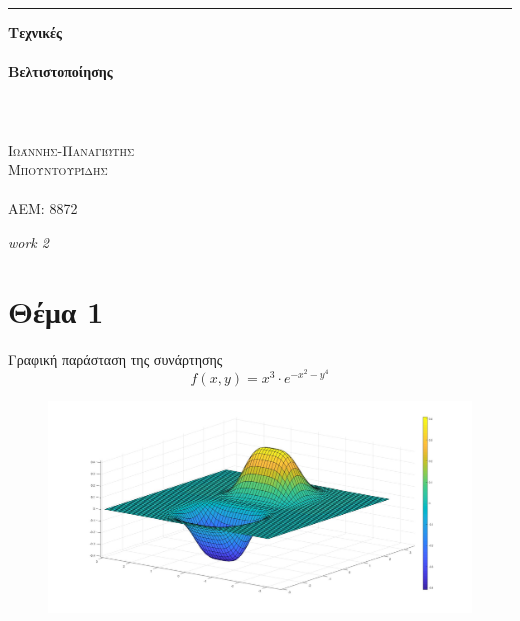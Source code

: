 \documentclass{article}
\date{}
\begin{document}
\begin{titlepage} %
	
	\raggedleft %
	
	\rule{1pt}{\textheight} %
	\hspace{0.05\textwidth} %
	\parbox[b]{0.75\textwidth}{ %
		
		{\Huge\bfseries Τεχνικές \\ \\
		Βελτιστοποίησης\\ \\ }\\[2\baselineskip] %
		{\large\textit{ }}\\[4\baselineskip] %
		{\Large\textsc{Ιωάννης-Παναγιώτης \\Μπουντουρίδης}} %
	\\	\\{\large\textsc{ΑΕΜ: 8872}} %
		
		\vspace{0.5\textheight} %
		
		{\noindent \textit{work 2}}\\[\baselineskip] %
	}

\end{titlepage}
\newpage
   
\section*{Θέμα 1 }

Γραφική παράσταση της συνάρτησης 
\begin{equation*}
f(x,y) = x^3 \cdot e^{-x^2-y^4}
\end{equation*}
\begin{figure}[h!]	
     \centering  
     \advance\leftskip-0.2cm  
  \includegraphics[width=130mm,scale=2]{functionF.jpg}
\end{figure} 
\end{document}
